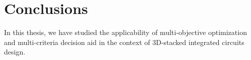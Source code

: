 \chapter{Conclusions}
\label{cha:conclusions}
\fancyhead[RE]{\bfseries\leftmark}

In this thesis, we have studied the applicability of multi-objective optimization and multi-criteria decision aid in the context of 3D-stacked integrated circuits design. 

